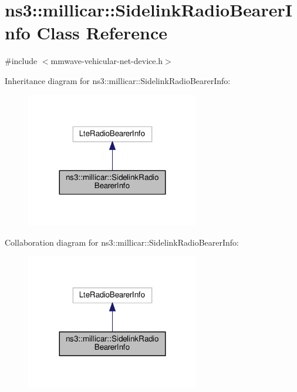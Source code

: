 \hypertarget{classns3_1_1millicar_1_1SidelinkRadioBearerInfo}{}\section{ns3\+:\+:millicar\+:\+:Sidelink\+Radio\+Bearer\+Info Class Reference}
\label{classns3_1_1millicar_1_1SidelinkRadioBearerInfo}


{\ttfamily \#include $<$mmwave-\/vehicular-\/net-\/device.\+h$>$}



Inheritance diagram for ns3\+:\+:millicar\+:\+:Sidelink\+Radio\+Bearer\+Info\+:\nopagebreak
\begin{figure}[H]
\begin{center}
\leavevmode
\includegraphics[width=215pt]{classns3_1_1millicar_1_1SidelinkRadioBearerInfo__inherit__graph}
\end{center}
\end{figure}


Collaboration diagram for ns3\+:\+:millicar\+:\+:Sidelink\+Radio\+Bearer\+Info\+:\nopagebreak
\begin{figure}[H]
\begin{center}
\leavevmode
\includegraphics[width=215pt]{classns3_1_1millicar_1_1SidelinkRadioBearerInfo__coll__graph}
\end{center}
\end{figure}
